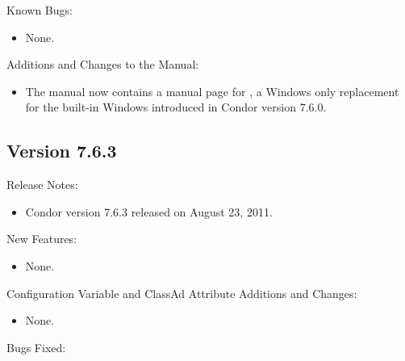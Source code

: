 \noindent Known Bugs:

\begin{itemize}

\item None.

\end{itemize}

\noindent Additions and Changes to the Manual:

\begin{itemize}

\item The manual now contains a manual page for ,
a Windows only replacement for the built-in Windows 
introduced in Condor version 7.6.0.

\end{itemize}


\subsection*{\label{sec:New-7-6-3}Version 7.6.3}

\noindent Release Notes:

\begin{itemize}

\item Condor version 7.6.3 released on August 23, 2011.

\end{itemize}


\noindent New Features:

\begin{itemize}

\item None.

\end{itemize}

\noindent Configuration Variable and ClassAd Attribute Additions and Changes:

\begin{itemize}

\item None.

\end{itemize}

\noindent Bugs Fixed:

